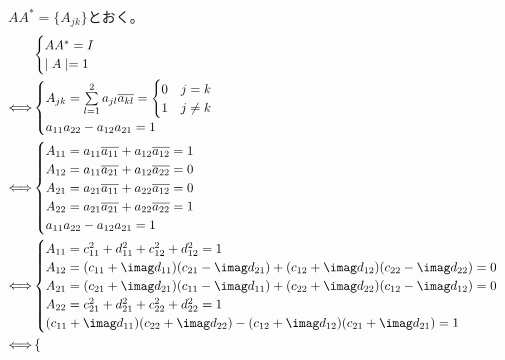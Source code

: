 \begin{itemize}
    $AA^{\ast} = \{ A_{jk}\}$とおく。
    \begin{align*}
        & \begin{cases}
            AA^{\ast} = I\\
            \mid A\mid = 1
        \end{cases}\\
        \Longleftrightarrow & 
        \begin{cases}
            A_{jk} = \sum\limits_{l = 1}^{2} a_{jl}\overline{a_{kl}}
            = 
            \begin{cases}
                0 & j = k\\
                1 & j \neq k  
            \end{cases}\\
            a_{11}a_{22} - a_{12}a_{21} = 1
        \end{cases}\\
        \Longleftrightarrow & 
        \begin{cases}
            A_{11} = a_{11}\overline{a_{11}} + a_{12}\overline{a_{12}} = 1\\
            A_{12} = a_{11}\overline{a_{21}} + a_{12}\overline{a_{22}} = 0\\
            A_{21} = a_{21}\overline{a_{11}} + a_{22}\overline{a_{12}} = 0\\
            A_{22} = a_{21}\overline{a_{21}} + a_{22}\overline{a_{22}} = 1\\
            a_{11}a_{22} - a_{12}a_{21} = 1
        \end{cases}\\
        \Longleftrightarrow & 
        \begin{cases}
            A_{11} = c_{11}^{2} + d_{11}^{2} + c_{12}^{2} + d_{12}^{2} = 1\\
            A_{12} = (c_{11} + \imag d_{11})(c_{21} - \imag d_{21}) + (c_{12} + \imag d_{12})(c_{22} - \imag d_{22}) = 0\\
            A_{21} = (c_{21} + \imag d_{21})(c_{11} - \imag d_{11}) + (c_{22} + \imag d_{22})(c_{12} - \imag d_{12}) = 0\\
            A_{22} = c_{21}^{2} + d_{21}^{2} + c_{22}^{2} + d_{22}^{2} = 1\\
            (c_{11} + \imag d_{11})(c_{22} + \imag d_{22}) - (c_{12} + \imag d_{12})(c_{21} + \imag d_{21}) = 1
        \end{cases}\\
        \Longleftrightarrow & 
        \begin{cases}

\end{cases}
\end{align*}
\end{itemize}
